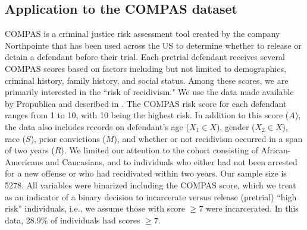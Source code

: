 \documentclass{article}
\begin{document}
\subsection*{Application to the COMPAS dataset}
COMPAS is a criminal justice risk assessment tool created by the company Northpointe that has been used across the US to determine whether to release or detain a defendant before their trial. Each pretrial defendant receives several COMPAS scores based on factors including but not limited to demographics, criminal history, family history, and social status. Among these scores, we are primarily interested in the ``risk of recidivism." We use the data made available by Propublica and described in \citet{angwin16machine}.  
The COMPAS risk score for each defendant ranges from 1 to 10, with 10 being the highest risk. In addition to this score ($A$), the data also includes records on defendant’s age ($X_1 \in X$), gender ($X_2 \in X$), race ($S$), prior convictions ($M$), and whether or not recidivism occurred in a span of two years ($R$). We limited our attention to the cohort consisting of African-Americans and Caucasians, and to individuals who either had not been arrested for a new offense or who had recidivated within two years. Our sample size is 5278. All variables were binarized including the COMPAS score, which we treat as an indicator of a binary decision to incarcerate versus release (pretrial) ``high risk'' individuals, i.e., we assume those with score $\geq 7$ were incarcerated. In this data, 28.9\% of individuals had scores $\geq 7$.
\end{document}
